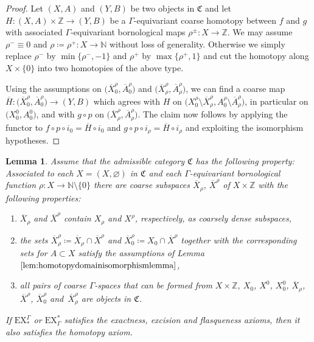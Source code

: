 \documentclass[pdftex]{sigma}
\numberwithin{equation}{section}
\newtheorem{lem}[thm]{Lemma}
\theoremstyle{definition}
\newcommand{\N}{\mathbb{N}}
\newcommand{\Z}{\mathbb{Z}}
\newcommand{\HomolX}{\mathrm{EX}}
\newcommand{\CohomX}{\mathrm{EX}}
\newcommand{\admissible}{{\mathfrak{C}}}
\begin{document}
\begin{proof}
Let $(X,A)$ and $(Y,B)$ be two objects in $\admissible$ and let $H\colon (X,A)\times \Z\to(Y,B)$ be a $\Gamma$-equivariant coarse homotopy between $f$ and $g$ with associated $\Gamma$-equivariant bornological maps $\rho^\pm\colon X\to\Z$. We may assume $\rho^-\equiv 0$ and $\rho\coloneqq\rho^+\colon X\to\N$ without loss of generality. Otherwise we simply replace $\rho^-$ by $\min\{\rho^-,-1\}$ and $\rho^+$ by $\max\{\rho^+,1\}$ and cut the homotopy along $X\times\{0\}$ into two homotopies of the above type.

Using the assumptions on $\big(\overline X_0^\rho,\overline A_0^\rho\big)$ and $\big(\overline X_\rho^\rho,\overline A_\rho^\rho\big)$, we can find a coarse map $\overline{H}\colon \big(\overline X_0^\rho,\overline A_0^\rho\big)\to (Y,B)$ which agrees with $H$ on $\big(X_0^\rho\setminus \overline X_\rho^\rho,A_0^\rho\setminus \overline A_\rho^\rho\big)$, in particular on $\big(X_0^0,A_0^0\big)$, and with $g\circ p$ on $\big(\overline X_\rho^\rho,\overline A_\rho^\rho\big)$.
The claim now follows by applying the functor to $f\circ p\circ i_0=\overline H\circ i_0$ and $g\circ p\circ i_\rho=\overline H\circ i_\rho$ and exploiting the isomorphism hypotheses.
\end{proof}


\begin{lem} \label{lem:flasquenessimplieshomotopyinvariance}
Assume that the admissible category $\admissible$ has the following property: Associated to each $X=(X,\varnothing)$ in $\admissible$ and each $\Gamma$-equivariant bornological function $\rho\colon X\to\N\setminus\{0\}$ there are coarse subspaces $\overline X_\rho$, $\overline X^\rho$ of $X\times \Z$ with the following properties:
\begin{enumerate}\itemsep=0pt
\item[$\bullet$] $\overline X_\rho$ and $\overline X^\rho$ contain $X_\rho$ and $X^\rho$, respectively, as coarsely dense subspaces,
\item[$\bullet$] the sets $\overline X_\rho^\rho\coloneqq \overline X_\rho\cap \overline X^\rho$ and $\overline X_0^\rho\coloneqq X_0\cap \overline X^\rho$ together with the corresponding sets for $A\subset X$ satisfy the assumptions of Lemma~$\ref{lem:homotopydomainisomorphismlemma}$,
\item[$\bullet$] all pairs of coarse $\Gamma$-spaces that can be formed from $X\times\Z$, $X_0$, $X^0$, $X_0^0$, $\overline X_\rho$, $\overline X^\rho$, $\overline X_0^\rho$ and~$\overline X_\rho^\rho$ are objects in $\admissible$.
\end{enumerate}
If $\HomolX^\Gamma_*$ or $\CohomX_\Gamma^*$ satisfies the exactness, excision and flasqueness axioms, then it also satisfies the homotopy axiom.
\end{lem}
\end{document}
